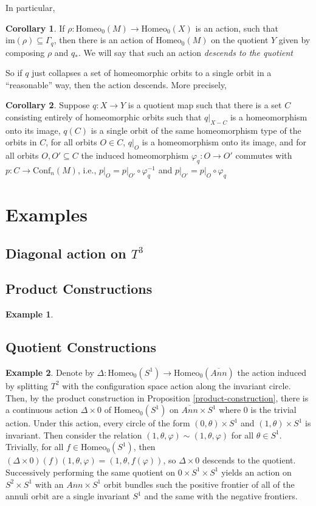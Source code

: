 \documentclass[10pt, oneside]{article}
\newcommand{\homeo}[1][S^1]{\text{Homeo}_0(#1)}
\newcommand{\conf}[2][S^1]{\text{Conf}_{#2}(#1)}
\theoremstyle{definition}
\newtheorem{ex}{Example}[section]
\newtheorem{cor}{Corollary}[section]
\theoremstyle{definition}
\begin{document}
In particular,
\begin{cor}
    If $\rho:\homeo[M]\to\homeo[X]$ is an action,
    such that $\text{im}(\rho)\subseteq \Gamma_q$,
    then there is an action
    of $\homeo[M]$
    on the quotient $Y$
    given by composing $\rho$ and $q_*$.
    We will say
    that such an action
    \textit{descends to the quotient}
\end{cor}
So if $q$ just collapses a set 
of homeomorphic orbits 
to a single orbit
in a ``reasonable'' way,
then the action descends. More precisely,

\begin{cor}
    Suppose $q: X\to Y$ is a quotient map
    such that there is a set $C$
    consisting entirely 
    of homeomorphic orbits 
    such that $q|_{X - C}$ is a homeomorphism onto its image,
    $q(C)$ is a single orbit 
    of the same homeomorphism type
    of the orbits
    in $C$,
    for all orbits $O\in C$, 
    $q|_O$ is a homeomorphism 
    onto its image,
    and for all orbits $O, O'\subseteq C$
    the induced homeomorphism $\varphi_q: O\to O'$ commutes with $p: C \to \conf[M]{n}$, i.e., $p\vert_O = p\vert_{O'}\circ\varphi_q^{-1}$ and  $p\vert_{O'} = p\vert_O\circ\varphi_q$
\end{cor}

\section{Examples}
\subsection{Diagonal action on \texorpdfstring{$T^3$}{T3}}
\subsection{Product Constructions}
\begin{ex}
    
\end{ex}
\subsection{Quotient Constructions}
\begin{ex}
    Denote by $\Delta:\homeo\to\homeo[\overline{Ann}]$ the action induced by splitting $T^2$ with the configuration space action along the invariant circle. Then, by the product construction in Proposition \ref{product-construction}, there is a continuous action $\Delta \times 0$ of $\homeo$ on $\overline{Ann}\times S^1$ where 0 is the trivial action. Under this action, every circle of the form $(0,\theta) \times S^1$ and $(1, \theta) \times S^1$ is invariant. Then consider the relation $(1, \theta, \varphi) \sim (1, \theta, \varphi)$ for all $\theta\in S^1$. Trivially, for all $f\in\homeo$, then $(\Delta\times 0)(f)(1,\theta, \varphi) = (1, \theta, f(\varphi))$, so $\Delta\times 0$ descends to the quotient. Successively performing the same quotient on $0\times S^1\times S^1$ yields an action on $S^2\times S^1$ with an $Ann\times S^1$ orbit bundles such the positive frontier of all of the annuli orbit are a single invariant $S^1$ and the same with the negative frontiers.
\end{ex}
\end{document}

